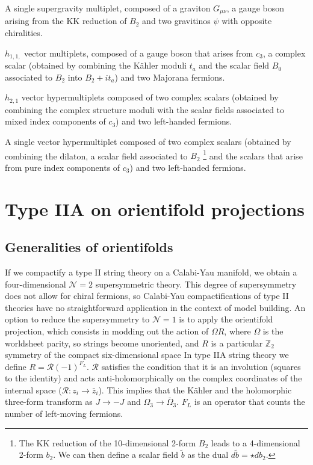 A single supergravity multiplet, composed of a graviton $G_{\mu\nu}$, a gauge boson arising from the KK reduction of $B_2$ and two gravitinos $\psi$ with opposite chiralities. 

$h_{1,1,}$ vector multiplets, composed of a gauge boson that arises from $c_3$, a complex scalar (obtained by combining the Kähler moduli $t_a$ and the scalar field $B_0$ associated to $B_2$ into $B_2+it_a$) and two Majorana fermions.

$h_{2,1}$ vector hypermultiplets composed of two complex scalars (obtained by combining the complex structure moduli with the scalar fields associated to mixed index components of $c_3$) and two left-handed fermions.

A single vector hypermultiplet composed of two complex scalars (obtained by combining the dilaton, a scalar field associated to $B_2$
\footnote{The KK reduction of the 10-dimensional 2-form $B_2$ leads to a 4-dimensional 2-form $b_2$.
We can then define a scalar field $\tilde b$ as the dual $d \tilde b = \star d b_2$.} and the scalars that arise from pure index components of $c_3$) and two left-handed fermions.

\section{Type IIA on orientifold projections}

\subsection{Generalities of orientifolds}
If we compactify a type II string theory on a Calabi-Yau manifold, we  obtain a four-dimensional
$\mathcal N=2$ supersymmetric theory.
This degree of supersymmetry does not allow for chiral fermions, so Calabi-Yau compactifications
of type II theories have no straightforward application in the context of model building.
An option to reduce the supersymmetry to $\mathcal N=1$  is to apply the orientifold
projection, which consists in modding out the action of $\Omega R$,
where $\Omega$ is the worldsheet parity, so strings become unoriented, and
$R$ is a particular $\mathbb Z_2$ symmetry of the compact six-dimensional space
In type IIA string theory we define $R=\mathcal R (-1)^{F_L}$.
$\mathcal R$ satisfies the condition that it is an involution (squares to the identity) and 
acts anti-holomorphically on the complex coordinates of the internal space ($\mathcal R: z_i \to \bar z_i$).
This implies that the Kähler and the holomorphic three-form transform as $J\to -J$ and $\Omega_3 \to \bar \Omega_3$.
$F_L$ is an operator that counts the number of left-moving fermions.

